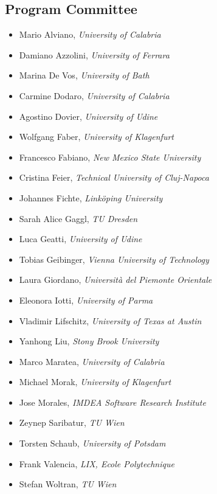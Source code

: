\documentclass[
]{ceurart}
\begin{document}
\subsection*{Program Committee}
\begin{itemize}
\item Mario Alviano, \emph{University of Calabria}
\item Damiano Azzolini, \emph{University of Ferrara}
\item Marina De Vos, \emph{University of Bath}
\item Carmine Dodaro, \emph{University of Calabria}
\item Agostino Dovier, \emph{University of Udine}
\item Wolfgang Faber, \emph{University of Klagenfurt}
\item Francesco Fabiano, \emph{New Mexico State University}
\item Cristina Feier, \emph{Technical University of Cluj-Napoca}
\item Johannes Fichte, \emph{Linköping University}
\item Sarah Alice Gaggl, \emph{TU Dresden}
\item Luca Geatti, \emph{University of Udine}
\item Tobias Geibinger, \emph{Vienna University of Technology}
\item Laura Giordano, \emph{Università del Piemonte Orientale}
\item Eleonora Iotti, \emph{University of Parma}
\item Vladimir Lifschitz, \emph{University of Texas at Austin}
\item Yanhong Liu, \emph{Stony Brook University}
\item Marco Maratea, \emph{University of Calabria}
\item Michael Morak, \emph{University of Klagenfurt}
\item Jose Morales, \emph{IMDEA Software Research Institute}
\item Zeynep Saribatur, \emph{TU Wien}
\item Torsten Schaub, \emph{University of Potsdam}
\item Frank Valencia, \emph{LIX, Ecole Polytechnique}
\item Stefan Woltran, \emph{TU Wien}
\end{itemize}
\end{document}
